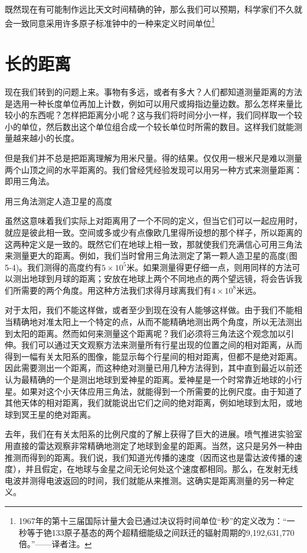 \documentclass[11pt,oneside]{book}
\begin{document}
\begin{common-format}
既然现在有可能制作远比天文时间精确的钟，那么我们可以预期，科学家们不久就会一致同意采用许多原子标准钟中的一种来定义时间单位\footnote{1967年的第十三届国际计量大会已通过决议将时间单位“秒”的定义改为：“一秒等于铯133原子基态的两个超精细能级之间跃迁的辐射周期的9,192,631,770倍。”——译者注。}



\section{长的距离}
现在我们转到的问题上来。事物有多远，或者有多大？人们都知道测量距离的方法是选用一种长度单位再加上计数，例如可以用尺或拇指边量边数。那么怎样来量比较小的东西呢？怎样把距离分小呢？这与我们将时间分小一样，我们同样取一个较小的单位，然后数出这个单位组合成一个较长单位时所需的数目。这样我们就能测量越来越小的长度。

但是我们并不总是把距离理解为用米尺量。得的结果。仅仅用一根米尺是难以测量两个山顶之间的水平距离的。我们曾经凭经验发现可以用另一种方式来测量距离：即用三角法。
\begin{fig}{用三角法测定人造卫星的高度}
\label{fig:用三角法测定人造卫星的高度}
\end{fig}
虽然这意味着我们实际上对距离用了一个不同的定义，但当它们可以一起应用时，就应是彼此相一致。空间或多或少有点像欧几里得所设想的那个样子，所以距离的这两种定义是一致的。既然它们在地球上相一致，那就使我们充满信心可用三角法来测量更大的距离。例如，我们当时曾用三角法测定了第一颗人造卫星的高度(图5-4)。我们测得的高度约有$ 5\times 10^5$米。如果测量得更仔细一点，则用同样的方法可以测出地球到月球的距离；安放在地球上两个不同地点的两个望远镜，将会告诉我们所需要的两个角度。用这种方法我们求得月球离我们有$ 4 \times 10^8 $米远。

对于太阳，我们不能这样做，或者至少到现在没有人能够这样做。由于我们不能相当精确地对准太阳上一个特定的点，从而不能精确地测出两个角度，所以无法测出到太阳的距离。然而如何来测量这个距离呢？我们必须将三角法这个观念加以引伸。我们可以通过天文观察方法来测量所有行星出现的位置之间的相对距离，从而得到一幅有关太阳系的图像，能显示每个行星间的相对距离，但都不是绝对距离。因此需要测出一个距离，而这种绝对测量已用几种方法得到，其中直到最近以前还认为最精确的一个是测出地球到爱神星的距离。爱神星是一个时常靠近地球的小行星。如果对这个小天体应用三角法，就能得到一个所需要的比例尺度。由于知道了其他天体的相对距离，我们就能说出它们之间的绝对距离，例如地球到太阳，或地球到冥王星的绝对距离。

去年，我们在有关太阳系的比例尺度的了解上获得了巨大的进展。喷气推进实验室用直接的雷达观察非常精确地测定了地球到金星的距离。当然，这只是另外一种由推测而得到的距离。我们说，我们知道光传播的速度（因而这也是雷达波传播的速度），并且假定，在地球与金星之间无论何处这个速度都相同。那么，在发射无线电波并测得电波返回的时间，我们就能从来推测。这确实是距离测量的另一种定义。


\end{common-format}
\end{document}
